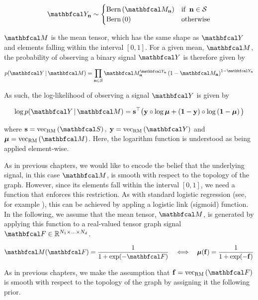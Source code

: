 \begin{equation}
    \Yt_\nn \sim  \begin{cases}
        \text{Bern}\left(\Mt_\nn \right) & \text{if} \;\; \nn \in \mathcal{S} \\
        \text{Bern}\left(0\right) & \text{otherwise}
    \end{cases}
\end{equation}


$\Mt$ is the mean tensor, which has the same shape as $\Yt$ and elements falling within the interval $[0, 1]$. For a given mean, $\Mt$, the probability of observing a binary signal $\Yt$ is therefore given by 

\begin{equation}
    p(\Yt \, | \, \Mt) = \prod_{\nn \in \mathcal{S}} \Mt_\nn^{\Yt_\nn}\left(1 - \Mt_\nn\right)^{1 - \Yt_\nn}
\end{equation}

As such, the log-likelihood of observing a signal $\Yt$ is given by 

\begin{equation}
   \log p(\Yt \, | \, \Mt) = \s^\top \big(\y \circ \log \muu + \left(\one  - \y\right) \circ \log \left(\one - \muu \right)\big)
\end{equation}

where $\s = \vecrm{\St}, \; \y = \vecrm{\Yt}$ and $\muu = \vecrm{\Mt}$. Here, the logarithm function is understood as being applied element-wise.

As in previous chapters, we would like to encode the belief that the underlying signal, in this case $\Mt$, is smooth with respect to the topology of the graph. However, since its elements fall within the interval $[0, 1]$, we need a function that enforces this restriction. As with standard logistic regression (see, for example \cite{Murphy2012}), this can be achieved by appling a logistic link (sigmoid) function. In the following, we assume that the mean tensor, $\Mt$, is generated by applying this function to a real-valued tensor graph signal $\Ft \in \R^{N_1 \times ... \times N_d}$. 

\begin{equation}
    \label{eq:logistic_link}
    \Mt(\Ft) = \frac{1}{1 + \exp(-\Ft)} \quad \Longleftrightarrow \quad \muu(\f) = \frac{1}{1 + \exp(-\f)}
\end{equation}

As in previous chapters, we make the assumption that $\f = \vecrm{\Ft}$ is smooth with respect to the topology of the graph by assigning it the following prior. 

